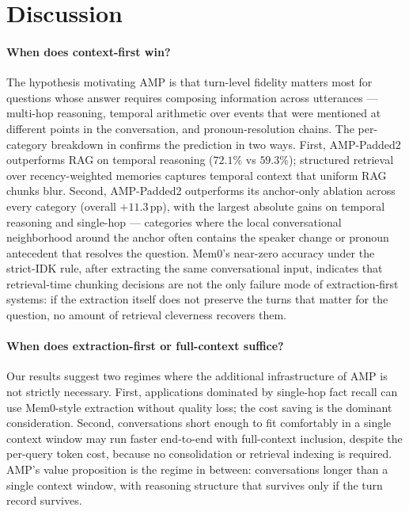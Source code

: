 \section{Discussion}
\label{sec:discussion}

\paragraph{When does context-first win?} The hypothesis motivating AMP is that turn-level fidelity matters most for questions whose answer requires composing information across utterances --- multi-hop reasoning, temporal arithmetic over events that were mentioned at different points in the conversation, and pronoun-resolution chains. The per-category breakdown in  confirms the prediction in two ways. First, AMP-Padded2 outperforms RAG on temporal reasoning ($72.1\%$ vs $59.3\%$); structured retrieval over recency-weighted memories captures temporal context that uniform RAG chunks blur. Second, AMP-Padded2 outperforms its anchor-only ablation across every category (overall $+11.3$\,pp), with the largest absolute gains on temporal reasoning and single-hop --- categories where the local conversational neighborhood around the anchor often contains the speaker change or pronoun antecedent that resolves the question. Mem0's near-zero accuracy under the strict-IDK rule, after extracting the same conversational input, indicates that retrieval-time chunking decisions are not the only failure mode of extraction-first systems: if the extraction itself does not preserve the turns that matter for the question, no amount of retrieval cleverness recovers them.

\paragraph{When does extraction-first or full-context suffice?} Our results suggest two regimes where the additional infrastructure of AMP is not strictly necessary. First, applications dominated by single-hop fact recall can use Mem0-style extraction without quality loss; the cost saving is the dominant consideration. Second, conversations short enough to fit comfortably in a single context window may run faster end-to-end with full-context inclusion, despite the per-query token cost, because no consolidation or retrieval indexing is required. AMP's value proposition is the regime in between: conversations longer than a single context window, with reasoning structure that survives only if the turn record survives.

